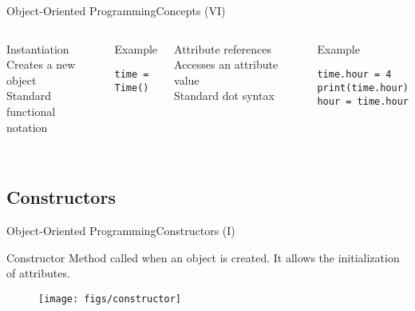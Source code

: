 \documentclass[10pt,compress]{beamer} %
\begin{document}
\begin{frame}[fragile]{Object-Oriented Programming}{Concepts (VI)}
    \begin{columns}
	   		\begin{block}{Instantiation}
			Creates a new object\\
			Standard functional notation\\
			\bigskip
			\\
	   		\end{block}
	   		\begin{exampleblock}{Example}
\begin{verbatim}
time = Time()
\end{verbatim}
	   		\end{exampleblock}

	   		\begin{block}{Attribute references}
			Accesses an attribute value\\
			Standard dot syntax\\
			\bigskip
			\\
	   		\end{block}
	   		\begin{exampleblock}{Example}
\begin{verbatim}
time.hour = 4
print(time.hour)
hour = time.hour
\end{verbatim}
	   		\end{exampleblock}
	\end{columns}
\end{frame}

\subsection{Constructors}

\begin{frame}{Object-Oriented Programming}{Constructors (I)}
	\begin{block}{Constructor}
		 Method called when an object is created. It allows the initialization of attributes. 
  	\end{block}	
		\begin{figure}
			\texttt{[image: figs/constructor]}
		\end{figure}				
\end{frame}
\end{document}
